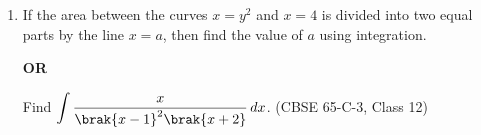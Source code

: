 \begin{enumerate}[label=\thesubsection.\arabic*., ref=\thesubsection.\theenumi]
\solution Here $a=1$, $b=3$ and $f\brak{x}=x^2+1+e^x$. From \eqref{eq:c12-riemann}, with $h=\frac{2}{n}$ so that $nh=2$,
\begin{align}
\int_1^3 f\brak{x}\,dx = \lim_{h\to 0}\ h\sum_{i=1}^{n}f\brak{1+ih}
\end{align}
\begin{align}
f\brak{1+ih} = \brak{1+ih}^2+1+e\cdot e^{ih}
= 2+2ih+i^2h^2+e\cdot e^{ih}
\end{align}
Using the sums in \eqref{eq:c12-riemann} and the geometric series,
\begin{align}
h\sum_{i=1}^{n}f\brak{1+ih}
= 2nh + h^2n\brak{n+1} + \frac{h^3n\brak{n+1}\brak{2n+1}}{6}
+ e\cdot\frac{h\,e^{h}\brak{e^{nh}-1}}{e^{h}-1}
\end{align}
Since $nh=2$, we have $h^2n\brak{n+1}=2\brak{2+h}$ and $h^3n\brak{n+1}\brak{2n+1}=2\brak{2+h}\brak{4+h}$. As $h\to 0$, $\frac{h}{e^h-1}\to 1$ and $e^h\to 1$, so
\begin{align}
\int_1^3\brak{x^2+1+e^x}\,dx = 4+4+\frac{8}{3}+e\brak{e^2-1}
= \frac{32}{3}+e^3-e
\end{align}
The code adds up the sums for increasing $n$ and compares with this value.
 
\begin{center}
\end{center}
 
\item If the area between the curves $x=y^2$ and $x=4$ is divided into two equal parts by the line $x=a$, then find the value of $a$ using integration.
\begin{center}\textbf{OR}\end{center}
Find $\displaystyle\int\frac{x}{\brak{x-1}^2\brak{x+2}}\,dx$.
\hfill (CBSE 65-C-3, Class 12)
 

\end{enumerate}
